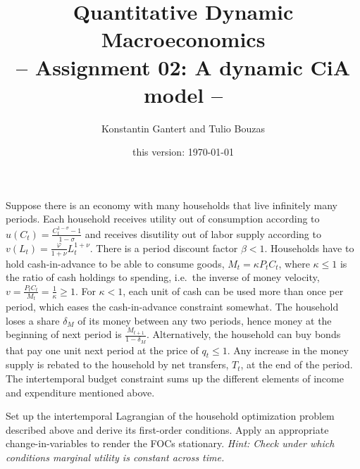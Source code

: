 \documentclass[a4paper, 12pt]{article}
\title{Quantitative Dynamic Macroeconomics \vspace{0.1in} \\ \large{-- Assignment 02: A dynamic CiA model --}}
\author{\small{Konstantin Gantert and Tulio Bouzas}}
\date{\small{this version: \today}}
\begin{document}
%
\clearpage\maketitle%
Suppose there is an economy with many households that live infinitely many periods. Each household receives utility out of consumption according to $u(C_t) = \frac{C_t^{1-\sigma}-1}{1-\sigma}$ and receives disutility out of labor supply according to $v(L_t) = \frac{\varphi}{1+\nu} L_t^{1+\nu}$. There is a period discount factor $\beta<1$. Households have to hold cash-in-advance to be able to consume goods, $M_t = \kappa P_t C_t$, where $\kappa \leq 1$ is the ratio of cash holdings to spending, i.e.\ the inverse of money velocity, $v = \frac{P_tC_t}{M_t} = \frac{1}{\kappa} \geq 1$. For $\kappa<1$, each unit of cash can be used more than once per period, which eases the cash-in-advance constraint somewhat. The household loses a share $\delta_M$ of its money between any two periods, hence money at the beginning of next period is $\frac{M_{t+1}}{1-\delta_M}$. Alternatively, the household can buy bonds that pay one unit next period at the price of $q_t \leq 1$. Any increase in the money supply is rebated to the household by net transfers, $T_t$, at the end of the period. The intertemporal budget constraint sums up the different elements of income and expenditure mentioned above.\\%
\bigskip%
\begin{Exercise}[title={Setting up and solving a dynamic model},label=ex_1]%
	Set up the intertemporal Lagrangian of the household optimization problem described above and derive its first-order conditions. Apply an appropriate change-in-variables to render the FOCs stationary. \emph{Hint: Check under which conditions marginal utility is constant across time.}%
\end{Exercise}%
\bigskip%
\end{document}
